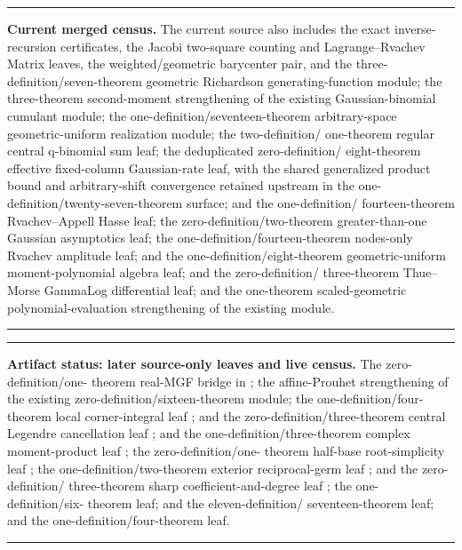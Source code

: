 \documentclass[11pt,oneside]{article}
\theoremstyle{definition}
\theoremstyle{remark}
\newenvironment{boxedremark}{%
  \par\smallskip\noindent\begin{center}\begin{minipage}{0.94\textwidth}%
  \color{black}\hrule\vspace{0.6em}\small
}{%
  \vspace{0.6em}\hrule\end{minipage}\end{center}\smallskip
}
\begin{document}
\begin{boxedremark}
\textbf{Current merged census.}
The current source also includes the exact inverse-recursion
certificates, the Jacobi two-square counting and Lagrange--Rvachev Matrix
leaves, the weighted/geometric barycenter pair, and the
three-definition/seven-theorem geometric Richardson generating-function
module; the three-theorem second-moment strengthening of the existing
Gaussian-binomial cumulant module; the one-definition/seventeen-theorem
arbitrary-space geometric-uniform realization module; the two-definition/
one-theorem regular central q-binomial sum leaf; the deduplicated zero-definition/
eight-theorem effective fixed-column Gaussian-rate leaf, with the shared
generalized product bound and arbitrary-shift convergence retained upstream in
the one-definition/twenty-seven-theorem
 surface; and the one-definition/
fourteen-theorem Rvachev--Appell Hasse leaf; the zero-definition/two-theorem
greater-than-one Gaussian asymptotics leaf; the one-definition/fourteen-theorem
nodes-only Rvachev amplitude leaf; and the one-definition/eight-theorem
geometric-uniform moment-polynomial algebra leaf; and the zero-definition/
three-theorem Thue--Morse GammaLog differential leaf; and the one-theorem
scaled-geometric polynomial-evaluation strengthening of the existing
 module.
\end{boxedremark}

\begin{boxedremark}
\textbf{Artifact status: later source-only leaves and live census.}
The zero-definition/one-
theorem real-MGF bridge in
; the affine-Prouhet
strengthening of the existing zero-definition/sixteen-theorem
 module; the one-definition/four-
theorem local corner-integral leaf ; and
the zero-definition/three-theorem central Legendre cancellation leaf
; and the one-definition/three-theorem
complex moment-product leaf
; the zero-definition/one-
theorem half-base root-simplicity leaf
; the one-definition/two-theorem
exterior reciprocal-germ leaf
; and the zero-definition/
three-theorem sharp coefficient-and-degree leaf
; the one-definition/six-
theorem  leaf; and the eleven-definition/
seventeen-theorem  leaf; and the
one-definition/four-theorem
 leaf.
\end{boxedremark}
\end{document}
